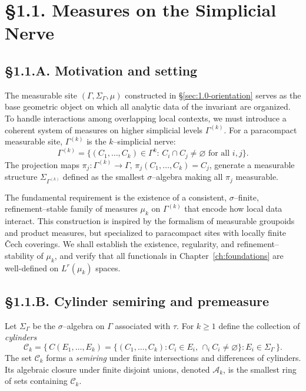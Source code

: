 \section{§1.1. Measures on the Simplicial Nerve}
\label{sec:1.1-measures}

\subsection*{§1.1.A. Motivation and setting}
The measurable site $(\Gamma,\Sigma_\Gamma,\mu)$ constructed in §\ref{sec:1.0-orientation} serves as the base geometric object on which all analytic data of the invariant are organized. 
To handle interactions among overlapping local contexts, we must introduce a coherent system of measures on higher simplicial levels $\Gamma^{(k)}$.
For a paracompact measurable site, $\Gamma^{(k)}$ is the $k$–simplicial nerve:
\[
\Gamma^{(k)}=\{(C_1,\ldots,C_k)\in \Gamma^k:\, C_i\cap C_j\neq\varnothing \text{ for all } i,j\}.
\]
The projection maps $\pi_j:\Gamma^{(k)}\to\Gamma$, $\pi_j(C_1,\ldots,C_k)=C_j$, generate a measurable structure $\Sigma_{\Gamma^{(k)}}$ defined as the smallest $\sigma$–algebra making all $\pi_j$ measurable. 

The fundamental requirement is the existence of a consistent, $\sigma$–finite, refinement–stable family of measures $\mu_k$ on $\Gamma^{(k)}$ that encode how local data interact.
This construction is inspired by the formalism of measurable groupoids and product measures, but specialized to paracompact sites with locally finite Čech coverings.
We shall establish the existence, regularity, and refinement–stability of $\mu_k$, and verify that all functionals in Chapter~\ref{ch:foundations} are well-defined on $L^r(\mu_k)$ spaces.

\subsection*{§1.1.B. Cylinder semiring and premeasure}

Let $\Sigma_\Gamma$ be the $\sigma$–algebra on $\Gamma$ associated with $\tau$. 
For $k\ge1$ define the collection of \emph{cylinders}
\[
\mathscr C_k = 
\bigl\{\, C(E_1,\ldots,E_k)
     = \{(C_1,\ldots,C_k): C_i\in E_i,\, \cap_i C_i\neq\varnothing\}
   : E_i\in\Sigma_\Gamma\,\bigr\}.
\]
The set $\mathscr C_k$ forms a \emph{semiring} under finite intersections and differences of cylinders. 
Its algebraic closure under finite disjoint unions, denoted $\mathscr A_k$, is the smallest ring of sets containing $\mathscr C_k$.

